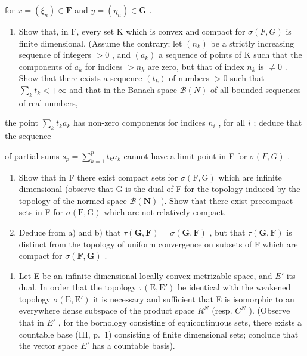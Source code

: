 for \(x = (\xi_n)\in \mathbf{F}\) and \(y = (\eta_{n})\in \mathbf{G}\) .

\begin{enumerate}
\def\labelenumi{\alph{enumi})}
\tightlist
\item
  Show that, in F, every set K which is convex and compact for \(\sigma(F, G)\) is finite dimensional. (Assume the contrary; let \((n_k)\) be a strictly increasing sequence of integers \(>0\) , and \((a_k)\) a sequence of points of K such that the components of \(a_k\) for indices \(>n_k\) are zero, but that of index \(n_k\) is \(\neq 0\) . Show that there exists a sequence \((t_k)\) of numbers \(>0\) such that \(\sum_{k} t_k < +\infty\) and that in the Banach space \(\mathcal{B}(N)\) of all bounded sequences of real numbers,
\end{enumerate}

the point \(\sum_{k} t_k a_k\) has non-zero components for indices \(n_i\) , for all \(i\) ; deduce that the sequence

of partial sums \(s_{p} = \sum_{k=1}^{p} t_k a_k\) cannot have a limit point in F for \(\sigma(F, G)\) .

\begin{enumerate}
\def\labelenumi{\alph{enumi})}
\setcounter{enumi}{1}
\item
  Show that in F there exist compact sets for \(\sigma(\mathrm{F},\mathrm{G})\) which are infinite dimensional (observe that G is the dual of F for the topology induced by the topology of the normed space \(\mathcal{B}(\mathbf{N})\) ). Show that there exist precompact sets in F for \(\sigma(\mathrm{F},\mathrm{G})\) which are not relatively compact.
\item
  Deduce from a) and b) that \(\tau(\mathbf{G},\mathbf{F})=\sigma(\mathbf{G},\mathbf{F})\) , but that \(\tau(\mathbf{G},\mathbf{F})\) is distinct from the topology of uniform convergence on subsets of F which are compact for \(\sigma(\mathbf{F},\mathbf{G})\) .
\end{enumerate}

\begin{enumerate}
\def\labelenumi{\arabic{enumi})}
\setcounter{enumi}{7}
\tightlist
\item
  Let E be an infinite dimensional locally convex metrizable space, and \(E'\) its dual. In order that the topology \(\tau(\mathrm{E}, \mathrm{E}')\) be identical with the weakened topology \(\sigma(\mathrm{E}, \mathrm{E}')\) it is necessary and sufficient that E is isomorphic to an everywhere dense subspace of the product space \(R^{N}\) (resp. \(C^{N}\) ). (Observe that in \(E'\) , for the bornology consisting of equicontinuous sets, there exists a countable base (III, p.~1) consisting of finite dimensional sets; conclude that the vector space \(E'\) has a countable basis).
\end{enumerate}

